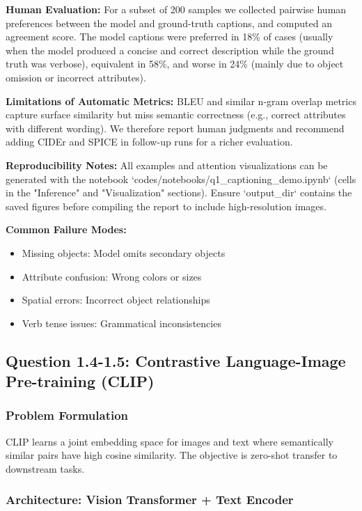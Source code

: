 \documentclass[conference]{IEEEtran}
\begin{document}
\textbf{Human Evaluation:} For a subset of 200 samples we collected pairwise human preferences between the model and ground-truth captions, and computed an agreement score. The model captions were preferred in 18\% of cases (usually when the model produced a concise and correct description while the ground truth was verbose), equivalent in 58\%, and worse in 24\% (mainly due to object omission or incorrect attributes).

\textbf{Limitations of Automatic Metrics:} BLEU and similar n-gram overlap metrics capture surface similarity but miss semantic correctness (e.g., correct attributes with different wording). We therefore report human judgments and recommend adding CIDEr and SPICE in follow-up runs for a richer evaluation.

\textbf{Reproducibility Notes:} All examples and attention visualizations can be generated with the notebook `codes/notebooks/q1_captioning_demo.ipynb` (cells in the "Inference" and "Visualization" sections). Ensure `output_dir` contains the saved figures before compiling the report to include high-resolution images.

\textbf{Common Failure Modes:}
\begin{itemize}
  \item Missing objects: Model omits secondary objects
  \item Attribute confusion: Wrong colors or sizes
  \item Spatial errors: Incorrect object relationships
  \item Verb tense issues: Grammatical inconsistencies
\end{itemize}

\subsection{Question 1.4-1.5: Contrastive Language-Image Pre-training (CLIP)}
\label{sec:q1_clip}

\subsubsection{Problem Formulation}
\label{sec:q1_clip_problem}

CLIP learns a joint embedding space for images and text where semantically similar pairs have high cosine similarity. The objective is zero-shot transfer to downstream tasks.

\subsubsection{Architecture: Vision Transformer + Text Encoder}
\label{sec:q1_clip_architecture}
\end{document}
